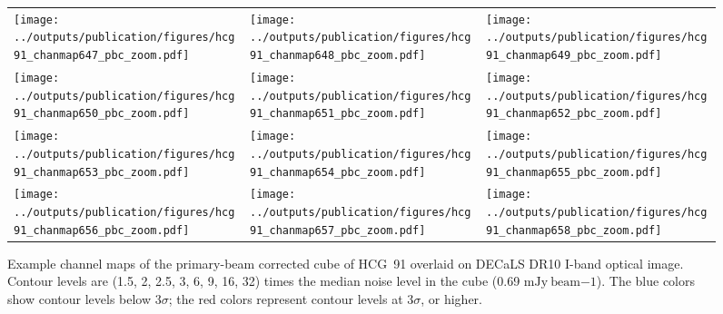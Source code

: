 \documentclass{aa}
\begin{document}
 \begin{figure*}
    \setlength{\tabcolsep}{0pt}
    \begin{tabular}{l l l}
        \texttt{[image: ../outputs/publication/figures/hcg91\_chanmap647\_pbc\_zoom.pdf]} &
        \texttt{[image: ../outputs/publication/figures/hcg91\_chanmap648\_pbc\_zoom.pdf]} &
        \texttt{[image: ../outputs/publication/figures/hcg91\_chanmap649\_pbc\_zoom.pdf]} \\[-0.2cm]
        \texttt{[image: ../outputs/publication/figures/hcg91\_chanmap650\_pbc\_zoom.pdf]} &
        \texttt{[image: ../outputs/publication/figures/hcg91\_chanmap651\_pbc\_zoom.pdf]} &
        \texttt{[image: ../outputs/publication/figures/hcg91\_chanmap652\_pbc\_zoom.pdf]} \\[-0.2cm]
        \texttt{[image: ../outputs/publication/figures/hcg91\_chanmap653\_pbc\_zoom.pdf]} &
        \texttt{[image: ../outputs/publication/figures/hcg91\_chanmap654\_pbc\_zoom.pdf]} &
        \texttt{[image: ../outputs/publication/figures/hcg91\_chanmap655\_pbc\_zoom.pdf]} \\[-0.2cm]
        \texttt{[image: ../outputs/publication/figures/hcg91\_chanmap656\_pbc\_zoom.pdf]} &
        \texttt{[image: ../outputs/publication/figures/hcg91\_chanmap657\_pbc\_zoom.pdf]} &
        \texttt{[image: ../outputs/publication/figures/hcg91\_chanmap658\_pbc\_zoom.pdf]} 
      \end{tabular}
      \caption{Example channel maps of the primary-beam corrected cube of HCG~91 overlaid on DECaLS DR10 I-band optical image. Contour levels are (1.5, 2,  2.5, 3, 6, 9, 16, 32) 
      times the median noise level in the cube (0.69 $\mathrm{mJy~beam{-1}}$). The blue colors show contour levels below 3$\sigma$; the red colors represent contour levels at 3$\sigma$, or higher.}
      \label{fig:hcg91_chanmap}
     \end{figure*}
\end{document}
